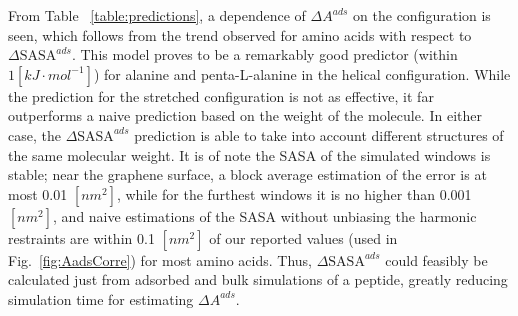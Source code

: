 \documentclass[journal=jcisd8,manuscript=article,layout=twocolumn]{achemso}
\begin{document}
 \begin{table}[htbp]
\centering

\caption{\label{table:predictions} Adsorption free energies ($\Delta A^{ads}$) along with predicted values (PV) of $\Delta A^{ads}$ from the adsorption sasa differences (PV$_{\textrm{SASA}}$)  and molecular weights (PV$_{\textrm{MW}}$) models of a single alanine residue and a penta-L-alanine  peptide; the latter in both stretched and helical configurations. Predictions are based on the linear regressions shown in Fig.~\ref{fig:AadsCorre} but excluding alanine from the regression data set. For the predictions, the reported error is the mean-square error of the regression.}
\end{table}

From Table ~\ref{table:predictions}, a dependence of $\Delta A^{ads}$ on the configuration is seen, which follows from the trend observed for amino acids with respect to $\Delta \textrm{SASA}^{ads}$.
This model proves to be a remarkably good predictor (within $1 [kJ \cdot mol^{-1}]$) for alanine and penta-L-alanine in the helical configuration. While the prediction for the stretched configuration is not as effective, it far outperforms a naive prediction based on the weight of the molecule.
In either case, the $\Delta \textrm{SASA}^{ads}$ prediction is able to take into account different structures of the same molecular weight.
It is of note the SASA of the simulated windows is stable;
 near the graphene surface, a block average estimation of the error is at most 0.01 $[nm^2]$, while for the furthest windows it is no higher than 0.001 $[nm^2]$, and naive estimations of the SASA without unbiasing the harmonic restraints are within 0.1 $[nm^2]$ of our reported values (used in Fig.~\ref{fig:AadsCorre}) for most amino acids.
 Thus, $\Delta \textrm{SASA}^{ads}$ could feasibly be calculated just from adsorbed and bulk simulations of a peptide, greatly reducing simulation time for estimating $\Delta A^{ads}$.
\end{document}
